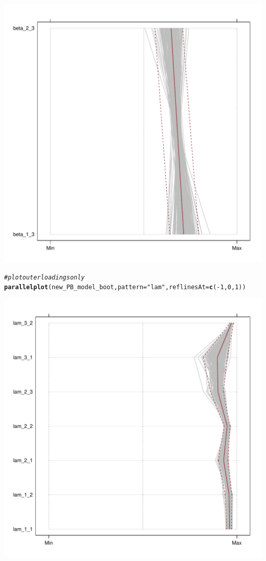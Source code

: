 \documentclass{article}\usepackage[]{graphicx}\usepackage[]{color}
\makeatletter
\def\maxwidth{ %
  \ifdim\Gin@nat@width>\linewidth
    \linewidth
  \else
    \Gin@nat@width
  \fi
}
\newcommand{\hlnum}[1]{\textcolor[rgb]{0.686,0.059,0.569}{#1}}%
\newcommand{\hlstr}[1]{\textcolor[rgb]{0.192,0.494,0.8}{#1}}%
\newcommand{\hlcom}[1]{\textcolor[rgb]{0.678,0.584,0.686}{\textit{#1}}}%
\newcommand{\hlopt}[1]{\textcolor[rgb]{0,0,0}{#1}}%
\newcommand{\hlstd}[1]{\textcolor[rgb]{0.345,0.345,0.345}{#1}}%
\newcommand{\hlkwc}[1]{\textcolor[rgb]{0.333,0.667,0.333}{#1}}%
\newcommand{\hlkwd}[1]{\textcolor[rgb]{0.737,0.353,0.396}{\textbf{#1}}}%
\newenvironment{kframe}{%
 \def\at@end@of@kframe{}%
 \ifinner\ifhmode%
  \def\at@end@of@kframe{\end{minipage}}%
  \begin{minipage}{\columnwidth}%
 \fi\fi%
 \def\FrameCommand##1{\hskip\@totalleftmargin \hskip-\fboxsep
 \colorbox{shadecolor}{##1}\hskip-\fboxsep
     \hskip-\linewidth \hskip-\@totalleftmargin \hskip\columnwidth}%
 \MakeFramed {\advance\hsize-\width
   \@totalleftmargin\z@ \linewidth\hsize
   \@setminipage}}%
 {\par\unskip\endMakeFramed%
 \at@end@of@kframe}
\newenvironment{knitrout}{}{} %
\makeatother
\begin{document}
\begin{knitrout}
\includegraphics[width=\maxwidth]{figure/boot2} 
\begin{kframe}\begin{alltt}
\hlcom{#plot outer loadings only}
\hlkwd{parallelplot}\hlstd{(new_PB_model_boot,} \hlkwc{pattern}\hlstd{=}\hlstr{"lam"}\hlstd{,}\hlkwc{reflinesAt}\hlstd{=}\hlkwd{c}\hlstd{(}\hlopt{-}\hlnum{1}\hlstd{,}\hlnum{0}\hlstd{,}\hlnum{1}\hlstd{))}
\end{alltt}
\end{kframe}
\includegraphics[width=\maxwidth]{figure/boot3} 

\end{knitrout}
\end{document}
